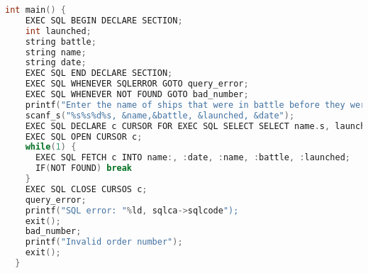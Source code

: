 \documentclass[../../main.tex]{subfiles}
\begin{document}
\begin{lstlisting}[language=c]
  int main() {
    EXEC SQL BEGIN DECLARE SECTION;
    int launched;
    string battle;
    string name;
    string date;
    EXEC SQL END DECLARE SECTION;
    EXEC SQL WHENEVER SQLERROR GOTO query_error;
    EXEC SQL WHENEVER NOT FOUND GOTO bad_number;
    printf("Enter the name of ships that were in battle before they were launched");
    scanf_s("%s%s%d%s, &name,&battle, &launched, &date");
    EXEC SQL DECLARE c CURSOR FOR EXEC SQL SELECT SELECT name.s, launched.s, date.b FROM Ships.s, Battles.b WHERE date<launced;
    EXEC SQL OPEN CURSOR c;
    while(1) {
      EXEC SQL FETCH c INTO name:, :date, :name, :battle, :launched;
      IF(NOT FOUND) break
    }
    EXEC SQL CLOSE CURSOS c;
    query_error;
    printf("SQL error: "%ld, sqlca->sqlcode");
    exit();
    bad_number;
    printf("Invalid order number");
    exit();
  }
\end{lstlisting}
\end{document}
